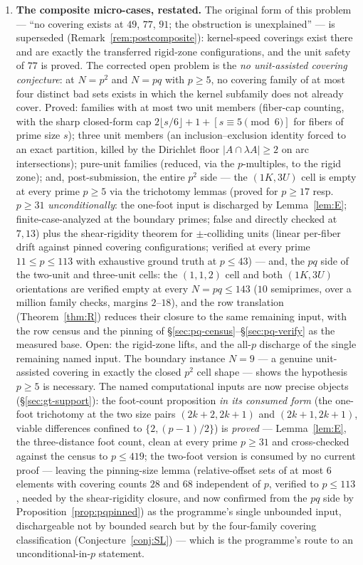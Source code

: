 \begin{enumerate}[leftmargin=1.7em,itemsep=4pt]
\item \textbf{The composite micro-cases, restated.} The original form of
  this problem --- ``no covering exists at $49$, $77$, $91$; the
  obstruction is unexplained'' --- is superseded
  (Remark~\ref{rem:postcomposite}): kernel-speed coverings exist there and
  are exactly the transferred rigid-zone configurations, and the unit
  safety of $77$ is proved. The corrected open problem is the \emph{no
  unit-assisted covering conjecture}: at $N=p^2$ and $N=pq$ with $p\ge5$,
  no covering family of at most four distinct bad sets exists in which the
  kernel subfamily does not already cover. Proved: families with at most
  two unit members (fiber-cap counting, with the sharp closed-form cap
  $2\lfloor s/6\rfloor+1+[s\equiv5\pmod6]$ for fibers of prime size $s$);
  three unit members (an inclusion--exclusion identity forced to an exact
  partition, killed by the Dirichlet floor $|A\cap\lambda A|\ge2$ on arc
  intersections); pure-unit families (reduced, via the $p$-multiples,
  to the rigid zone); and, post-submission, the entire $p^2$ side --- the
  $(1K,3U)$ cell is empty at every prime $p\ge5$ via the trichotomy
  lemmas (proved for $p\ge17$ resp.\ $p\ge31$ \emph{unconditionally}: the
  one-foot input is discharged by Lemma~\ref{lem:E}; finite-case-analyzed
  at the boundary primes; false and directly checked at $7,13$) plus the
  shear-rigidity theorem for $\pm$-colliding units
  (linear per-fiber drift against pinned covering configurations;
  verified at every prime $11\le p\le113$ with exhaustive ground truth at $p\le43$) --- and, the $pq$ side of
  the two-unit and three-unit cells: the $(1,1,2)$ cell and both
  $(1K,3U)$ orientations are verified empty at every $N=pq\le143$ ($10$
  semiprimes, over a million family checks, margins $2$--$18$), and the
  row translation (Theorem~\ref{thm:R}) reduces their closure to the same
  remaining input, with the row census and the pinning of
  \S\ref{sec:pq-census}--\S\ref{sec:pq-verify} as the measured base.
  Open: the rigid-zone lifts, and the all-$p$ discharge of the single
  remaining named input. The boundary
  instance $N=9$ --- a genuine unit-assisted covering in exactly the
  closed $p^2$ cell shape --- shows the hypothesis $p\ge5$ is necessary.
  The named computational inputs are now precise
  objects (\S\ref{sec:gt-support}): the foot-count proposition \emph{in
  its consumed form} (the one-foot trichotomy at the two size pairs
  $(2k{+}2,2k{+}1)$ and $(2k{+}1,2k{+}1)$, viable differences confined to
  $\{2,(p-1)/2\}$) is \emph{proved} --- Lemma~\ref{lem:E}, the
  three-distance foot count, clean at every prime $p\ge31$ and
  cross-checked against the census to $p\le419$; the two-foot version is
  consumed by no current proof --- leaving the
  pinning-size lemma (relative-offset sets of at most $6$ elements with
  covering counts $28$ and $68$ independent of $p$, verified to
  $p\le113$, needed by the shear-rigidity closure, and now confirmed from
  the $pq$ side by Proposition~\ref{prop:pqpinned}) as the programme's
  single unbounded input, dischargeable not by
  bounded search but by the four-family covering classification
  (Conjecture~\ref{conj:SL}) --- which is the programme's route to an
  unconditional-in-$p$ statement.


\end{enumerate}
